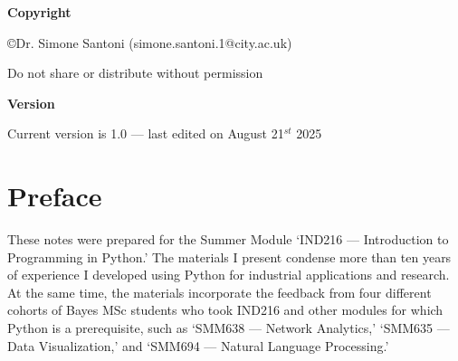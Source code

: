 \documentclass[a4paper,11pt]{book}
\begin{document}

\clearpage
\centering 


\vspace{6em}

\textbf{Copyright}

\copyright Dr. Simone Santoni (simone.santoni.1@city.ac.uk)

Do not share or distribute without permission

\vspace{3em}

\textbf{Version}

Current version is 1.0 --- last edited on August 21$^{st}$ 2025
\clearpage

\tableofcontents

\listoffigures

\listoftables

\clearpage

\mainmatter
\chapter*{Preface}

\raggedright These notes were prepared for the Summer Module `IND216 --- Introduction to Programming in Python.' The materials I present condense more than ten years of experience I developed using Python for industrial applications and research. At the same time, the materials incorporate the feedback from four different cohorts of Bayes MSc students who took IND216 and other modules for which Python is a prerequisite, such as `SMM638 --- Network Analytics,' `SMM635 --- Data Visualization,' and `SMM694 --- Natural Language Processing.' 
\end{document}
